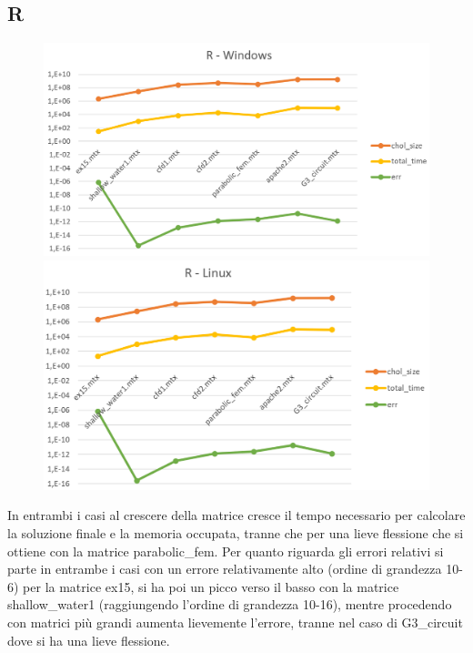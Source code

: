 \documentclass[a4paper,10pt]{article}
\begin{document}
\subsection{R}


\begin{figure}[H]
\centering
\begin{minipage}{.6\textwidth}
  \centering
  \includegraphics[width=1\linewidth]{img/Rwin.png}
\end{minipage}%
\begin{minipage}{.6\textwidth}
  \centering
  \includegraphics[width=1\linewidth]{img/Rlinux.png}
\end{minipage}
\end{figure}


In entrambi i casi al crescere della matrice cresce il tempo necessario per calcolare la soluzione finale e la memoria occupata, tranne che per una lieve flessione che si ottiene con la matrice parabolic\_fem. 
Per quanto riguarda gli errori relativi si parte in entrambe i casi con un errore relativamente alto (ordine di grandezza 10-6) per la matrice ex15, si ha poi un picco verso il basso con la matrice shallow\_water1 (raggiungendo l’ordine di grandezza 10-16), mentre procedendo con matrici più grandi aumenta lievemente l’errore, tranne nel caso di G3\_circuit dove si ha una lieve flessione. 
\end{document}

